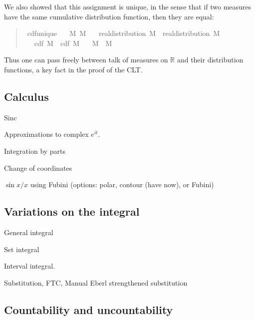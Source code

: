 \documentclass{svjour3}
\newcommand{\todo}[1]{{\color{red}#1}}
\newcommand{\RR}{\mathbb{R}}
\begin{document}
We also showed that this assignment is unique, in the sense that if two measures have the same cumulative distribution function, then they are equal: 
\begin{quote}
\begin{isabellebody}
\isamarkupfalse%
\ cdf{\isacharunderscore}unique{\isacharcolon}\isanewline
\ \ \ M{}\ M{}\isanewline
\ \ \ {\isachardoublequoteopen}real{\isacharunderscore}distribution\ M{}{\isachardoublequoteclose}\ \ {\isachardoublequoteopen}real{\isacharunderscore}distribution\ M{}{\isachardoublequoteclose}\isanewline
\ \ \ {\isachardoublequoteopen}cdf\ M{}\ {\isacharequal}\ cdf\ M{}{\isachardoublequoteclose}\isanewline
\ \ \ {\isachardoublequoteopen}M{}\ {\isacharequal}\ M{}{\isachardoublequoteclose}
\end{isabellebody}
\end{quote}
Thus one can pass freely between talk of measures on $\RR$ and their distribution functions, a key fact in the proof of the CLT.

\subsection{Calculus}

\todo{
Sinc

Approximations to complex $e^{it}$.

Integration by parts

Change of coordinates

$\sin x / x$ using Fubini (options: polar, contour (have now), or Fubini)
}

\subsection{Variations on the integral}

\todo{ 
General integral

Set integral

Interval integral.

Substitution, FTC, Manual Eberl strengthened substitution
}

\subsection{Countability and uncountability}
\end{document}
